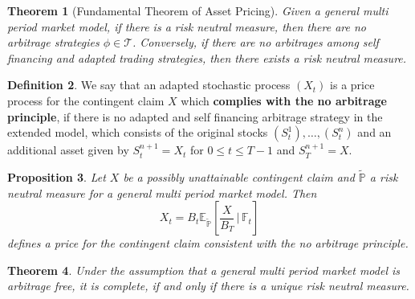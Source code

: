 \documentclass[10pt, oneside, reqno]{amsart}
\theoremstyle{plain}%
\newtheorem{thm}{Theorem}[subsection]
\newtheorem{prop}[thm]{Proposition}
\theoremstyle{definition}
\newtheorem{defn}[thm]{Definition}
\theoremstyle{remark}
\newcommand{\expp}[1]{\mathbb{E}_{\rnm}\left[#1\right]}
\newcommand{\given}{ \, | \,}
\newcommand{\F}{\mathbb{F}}
\newcommand{\rnm}{\tilde{\mathbb{P}}}
\begin{document}
\begin{thm}[Fundamental Theorem of Asset Pricing]
	Given a general multi period market model, if there is a risk neutral measure, then there are no arbitrage strategies $\phi \in \mathcal{T}$.  Conversely, if there are no arbitrages among self financing and adapted trading strategies, then there exists a risk neutral measure.
\end{thm}

\begin{defn}We say that an adapted stochastic process $(X_t)$ is a price process for the contingent claim $X$ which \textbf{complies with the no arbitrage principle}, if there is no adapted and self financing arbitrage strategy in the extended model, which consists of the original stocks $(S_t^1),\dots,(S_t^n)$ and an additional asset given by $S^{n+1}_t = X_t$ for $0 \leq t \leq T-1$ and $S^{n+1}_T = X$. 
\end{defn}

\begin{prop}
	Let $X$ be a possibly unattainable contingent claim and $\rnm$ a risk neutral measure for a general multi period market model.  Then \[
		X_t = B_t \expp{\frac{X}{B_T} \given \F_t}
	\] defines a price for the contingent claim consistent with the no arbitrage principle.
\end{prop}

\begin{thm}
	Under the assumption that a general multi period market model is arbitrage free, it is complete, if and only if there is a unique risk neutral measure.
\end{thm}

\end{document}

